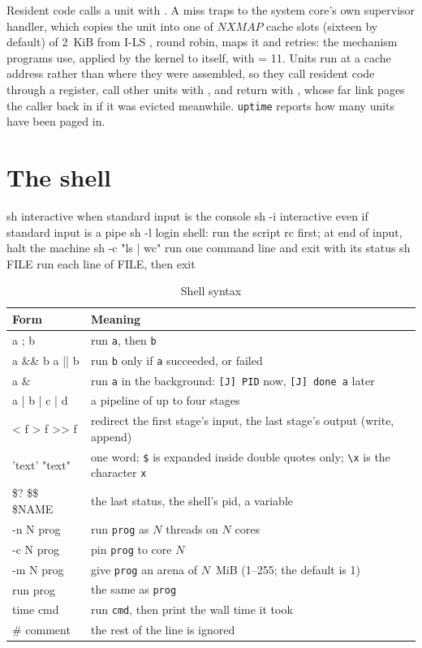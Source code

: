 Resident code calls a unit with . A miss traps to the system core's own
supervisor handler, which copies the unit into one of $\textit{NXMAP}$ cache slots (sixteen by
default) of 2~KiB from I-LS , round robin, maps it and retries: the mechanism programs use, applied by the
kernel to itself, with  = 11. Units run at a cache address rather than where they were
assembled, so they call resident code through a register, call other units with , and
return with , whose far link pages the caller back in if it was evicted meanwhile.
\texttt{uptime} reports how many units have been paged in.

\section{The shell}\label{sec:os-sh}

\begin{shell}
sh                  interactive when standard input is the console
sh -i               interactive even if standard input is a pipe
sh -l               login shell: run the script rc first; at end of input, halt the machine
sh -c "ls | wc"     run one command line and exit with its status
sh FILE             run each line of FILE, then exit
\end{shell}

\begin{table}[htbp]
\centering\small
\caption{Shell syntax}\label{tab:shell}
\begin{tabularx}{\linewidth}{@{}>{\ttfamily}l X@{}}
\toprule
\textrm{\bfseries Form} & \textbf{Meaning}\\\midrule
a ; b & run \texttt{a}, then \texttt{b}\\
a \&\& b \quad a || b & run \texttt{b} only if \texttt{a} succeeded, or failed\\
a \& & run \texttt{a} in the background: \texttt{[J] PID} now, \texttt{[J] done  a} later\\
a | b | c | d & a pipeline of up to four stages\\
< f \quad > f \quad >> f & redirect the first stage's input, the last stage's output (write, append)\\
'text' \quad "text" & one word; \texttt{\$} is expanded inside double quotes only; \texttt{\textbackslash x} is the character \texttt{x}\\
\$? \quad \$\$ \quad \$NAME & the last status, the shell's pid, a variable\\
-n N prog & run \texttt{prog} as $N$ threads on $N$ cores\\
-c N prog & pin \texttt{prog} to core $N$\\
-m N prog & give \texttt{prog} an arena of $N$~MiB (1--255; the default is 1)\\
run prog & the same as \texttt{prog}\\
time cmd & run \texttt{cmd}, then print the wall time it took\\
\# comment & the rest of the line is ignored\\
\bottomrule
\end{tabularx}
\end{table}

